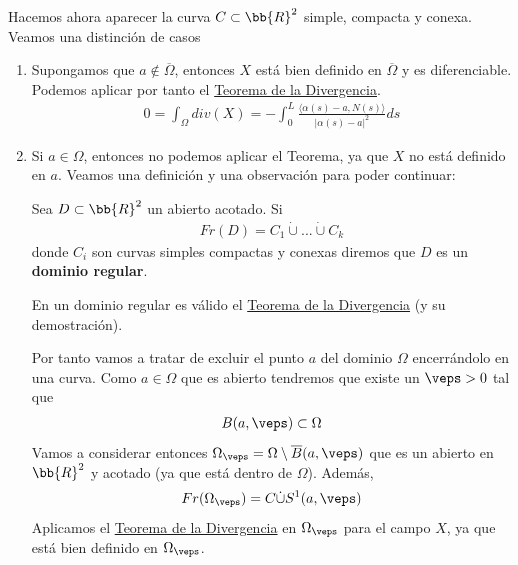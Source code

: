 \begin{observacion}
\begin{enumerate}[start=4]
        Hacemos ahora aparecer la curva $C\subset \bb{R}^2$ simple, compacta y conexa. Veamos una distinción de casos
        \begin{enumerate}
            \item Supongamos que $a\notin \overline{\Omega}$, entonces $X$ está bien definido en $\overline{\Omega}$ y es diferenciable. Podemos aplicar por tanto el \hyperref[teo:divergencia]{Teorema de la Divergencia}.
            \begin{gather*}
                0 = \int_\Omega div(X) = - \int_0^L \frac{\langle \alpha(s)-a, N(s)\rangle}{|\alpha(s)-a|^2} ds
            \end{gather*}

            \item Si $a\in \Omega$, entonces no podemos aplicar el Teorema, ya que $X$ no está definido en $a$. Veamos una definición y una observación para poder continuar:
            \begin{definicion}
                Sea $D\subset \bb{R}^2$ un abierto acotado. Si 
                \begin{gather*}
                    Fr(D) = C_1 \dot{\cup} ... \dot{\cup} C_k
                \end{gather*}
                donde $C_i$ son curvas simples compactas y conexas diremos que $D$ es un \textbf{dominio regular}.
            \end{definicion}
            \begin{observacion}
                En un dominio regular es válido el \hyperref[teo:divergencia]{Teorema de la Divergencia} (y su demostración).
            \end{observacion}

            Por tanto vamos a tratar de excluir el punto $a$ del dominio $\Omega$ encerrándolo en una curva. Como $a\in \Omega$ que es abierto tendremos que existe un $\veps>0$ tal que 
            \begin{gather*}
                B(a,\veps) \subset \Omega
            \end{gather*}
            Vamos a considerar entonces $\Omega_\veps = \Omega \setminus \overline{B}(a,\veps)$ que es un abierto en $\bb{R}^2$ y acotado (ya que está dentro de $\Omega$). Además,
            \begin{gather*}
                Fr(\Omega_\veps) = C \dot{\cup} S^1(a,\veps)
            \end{gather*}
            Aplicamos el \hyperref[teo:divergencia]{Teorema de la Divergencia} en $\Omega_\veps$ para el campo $X$, ya que está bien definido en $\Omega_\veps$.


\end{enumerate}
\end{enumerate}
\end{observacion}
